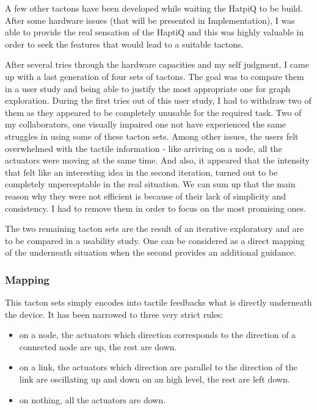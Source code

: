 A few other tactons have been developed while waiting the HatpiQ to be
build. After some hardware issues (that will be presented in
Implementation), I was able to provide the real sensation of the HaptiQ
and this was highly valuable in order to seek the features that would
lead to a suitable tactons.

After several tries through the hardware capacities and my self
judgment, I came up with a last generation of four sets of tactons. The
goal was to compare them in a user study and being able to justify the
most appropriate one for graph exploration. During the first tries out
of this user study, I had to withdraw two of them as they appeared to be
completely unusable for the required task. Two of my collaborators, one
visually impaired one not have experienced the same struggles in using
some of these tacton sets. Among other issues, the users felt
overwhelmed with the tactile information - like arriving on a node, all
the actuators were moving at the same time. And also, it appeared that
the intensity that felt like an interesting idea in the second
iteration, turned out to be completely unperceptable in the real
situation. We can sum up that the main reason why they were not
efficient is because of their lack of simplicity and consistency. I had
to remove them in order to focus on the most promising ones.

The two remaining tacton sets are the result of an iterative exploratory
and are to be compared in a usability study. One can be considered as a
direct mapping of the underneath situation when the second provides an
additional guidance.

\subsubsection{Mapping}\label{mapping}

This tacton sets simply encodes into tactile feedbacks what is directly
underneath the device. It has been narrowed to three very strict rules:

\begin{itemize}
\item
  on a node, the actuators which direction corresponds to the direction
  of a connected node are up, the rest are down.
\item
  on a link, the actuators which direction are parallel to the direction
  of the link are oscillating up and down on an high level, the rest are
  left down.
\item
  on nothing, all the actuators are down.
\end{itemize}


